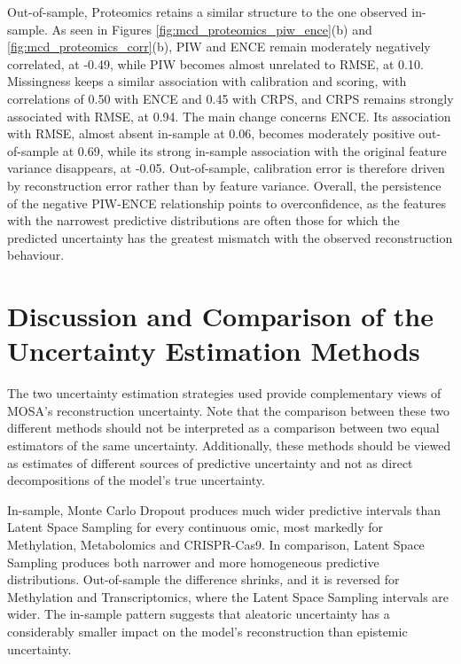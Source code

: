 Out-of-sample, Proteomics retains a similar structure to the one observed in-sample. As seen in Figures \ref{fig:mcd_proteomics_piw_ence}(b) and \ref{fig:mcd_proteomics_corr}(b), PIW and ENCE remain moderately negatively correlated, at -0.49, while PIW becomes almost unrelated to RMSE, at 0.10. Missingness keeps a similar association with calibration and scoring, with correlations of 0.50 with ENCE and 0.45 with CRPS, and CRPS remains strongly associated with RMSE, at 0.94. The main change concerns ENCE. Its association with RMSE, almost absent in-sample at 0.06, becomes moderately positive out-of-sample at 0.69, while its strong in-sample association with the original feature variance disappears, at -0.05. Out-of-sample, calibration error is therefore driven by reconstruction error rather than by feature variance. Overall, the persistence of the negative PIW-ENCE relationship points to overconfidence, as the features with the narrowest predictive distributions are often those for which the predicted uncertainty has the greatest mismatch with the observed reconstruction behaviour.



\section{Discussion and Comparison of the Uncertainty Estimation Methods}


The two uncertainty estimation strategies used provide complementary views of MOSA's reconstruction uncertainty. Note that the comparison between these two different methods should not be interpreted as a comparison between two equal estimators of the same uncertainty. Additionally, these methods should be viewed as estimates of different sources of predictive uncertainty and not as direct decompositions of the model's true uncertainty.


In-sample, Monte Carlo Dropout produces much wider predictive intervals than Latent Space Sampling for every continuous omic, most markedly for Methylation, Metabolomics and CRISPR-Cas9. In comparison, Latent Space Sampling produces both narrower and more homogeneous predictive distributions. Out-of-sample the difference shrinks, and it is reversed for Methylation and Transcriptomics, where the Latent Space Sampling intervals are wider. The in-sample pattern suggests that aleatoric uncertainty has a considerably smaller impact on the model's reconstruction than epistemic uncertainty. 

